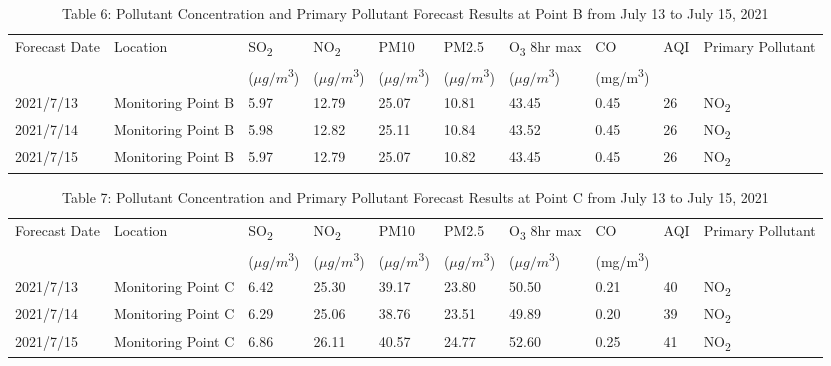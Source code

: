 \documentclass[12pt]{article}
\begin{document}
\begin{table}[h!]
	\centering
	\begin{adjustbox}{width=1\textwidth}
	\begin{tabular}{llllllllll}
		\hline
		Forecast Date & Location & SO\textsubscript{2} & NO\textsubscript{2} & PM10 & PM2.5 & O\textsubscript{3} 8hr max & CO & AQI & Primary Pollutant \\
		& & ($\mu g/m$\textsuperscript{3}) & ($\mu g/m$\textsuperscript{3}) & ($\mu g/m$\textsuperscript{3}) & ($\mu g/m$\textsuperscript{3}) & ($\mu g/m$\textsuperscript{3}) & (mg/m\textsuperscript{3}) & & \\
		\hline
		2021/7/13 & Monitoring Point B & 5.97 & 12.79 & 25.07 & 10.81 & 43.45 & 0.45 & 26 & NO\textsubscript{2} \\
		2021/7/14 & Monitoring Point B & 5.98 & 12.82 & 25.11 & 10.84 & 43.52 & 0.45 & 26 & NO\textsubscript{2} \\
		2021/7/15 & Monitoring Point B & 5.97 & 12.79 & 25.07 & 10.82 & 43.45 & 0.45 & 26 & NO\textsubscript{2} \\
		\hline
	\end{tabular}
	\end{adjustbox}
	\caption{Table 6: Pollutant Concentration and Primary Pollutant Forecast Results at Point B from July 13 to July 15, 2021}
	\label{tab:pollutant_concentration_point_b}
\end{table}

\begin{table}[h!]
	\centering
	\begin{adjustbox}{width=1\textwidth}
	\begin{tabular}{llllllllll}
		\hline
		Forecast Date & Location & SO\textsubscript{2} & NO\textsubscript{2} & PM10 & PM2.5 & O\textsubscript{3} 8hr max & CO & AQI & Primary Pollutant \\
		& & ($\mu g/m$\textsuperscript{3}) & ($\mu g/m$\textsuperscript{3}) & ($\mu g/m$\textsuperscript{3}) & ($\mu g/m$\textsuperscript{3}) & ($\mu g/m$\textsuperscript{3}) & (mg/m\textsuperscript{3}) & & \\
		\hline
		2021/7/13 & Monitoring Point C & 6.42 & 25.30 & 39.17 & 23.80 & 50.50 & 0.21 & 40 & NO\textsubscript{2} \\
		2021/7/14 & Monitoring Point C & 6.29 & 25.06 & 38.76 & 23.51 & 49.89 & 0.20 & 39 & NO\textsubscript{2} \\
		2021/7/15 & Monitoring Point C & 6.86 & 26.11 & 40.57 & 24.77 & 52.60 & 0.25 & 41 & NO\textsubscript{2} \\
		\hline
	\end{tabular}
	\end{adjustbox}
	\caption{Table 7: Pollutant Concentration and Primary Pollutant Forecast Results at Point C from July 13 to July 15, 2021}
	\label{tab:pollutant_concentration_point_c}
\end{table}
\end{document}
